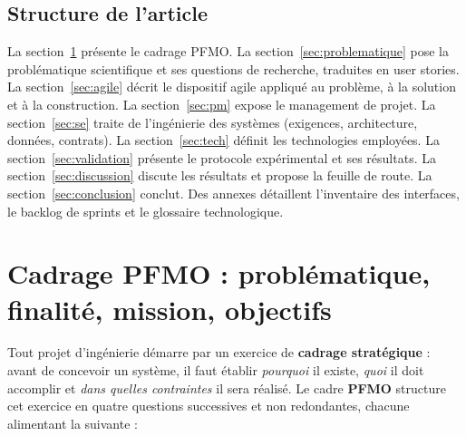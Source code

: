 \documentclass[11pt,a4paper]{article}
\begin{document}
\subsection*{Structure de l'article}
La section~\ref{sec:pfmo} présente le cadrage PFMO. La section~\ref{sec:problematique} pose la
problématique scientifique et ses questions de recherche, traduites en user stories. La
section~\ref{sec:agile} décrit le dispositif agile appliqué au problème, à la solution et à la
construction. La section~\ref{sec:pm} expose le management de projet. La
section~\ref{sec:se} traite de l'ingénierie des systèmes (exigences, architecture, données, contrats).
La section~\ref{sec:tech} définit les technologies employées. La section~\ref{sec:validation} présente
le protocole expérimental et ses résultats. La section~\ref{sec:discussion} discute les résultats et
propose la feuille de route. La section~\ref{sec:conclusion} conclut. Des annexes détaillent l'inventaire
des interfaces, le backlog de sprints et le glossaire technologique.

\section{Cadrage PFMO : problématique, finalité, mission, objectifs}
\label{sec:pfmo}

Tout projet d'ingénierie démarre par un exercice de \textbf{cadrage stratégique} : avant de concevoir un
système, il faut établir \textit{pourquoi} il existe, \textit{quoi} il doit accomplir et \textit{dans quelles
contraintes} il sera réalisé. Le cadre \textbf{PFMO} structure cet exercice en quatre questions successives
et non redondantes, chacune alimentant la suivante :
\end{document}
